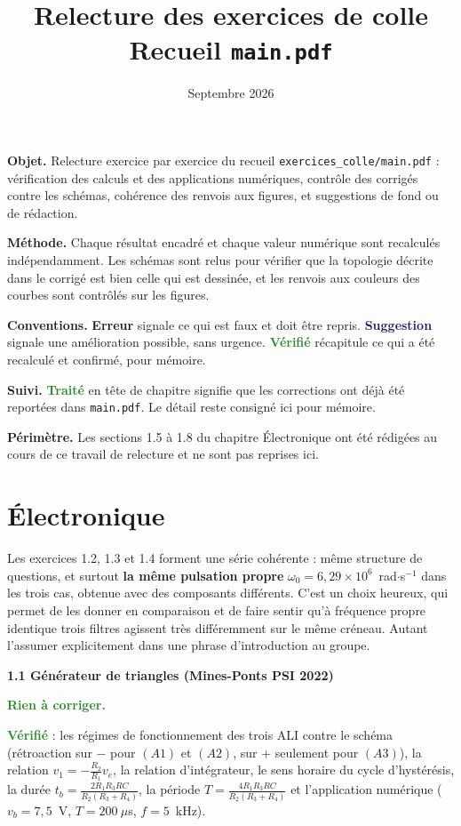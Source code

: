 \documentclass[a4paper,11pt]{article}
\title{\vspace{-1.5cm}Relecture des exercices de colle\\[0.3em]\large Recueil \texttt{main.pdf}}
\author{}
\date{Septembre 2026}
\newcommand{\exo}[1]{\vspace{0.7\baselineskip}\noindent\textbf{\large #1}\par\nopagebreak\vspace{0.2\baselineskip}}
\newcommand{\erreur}{\textcolor{BrickRed}{\textbf{Erreur}}}
\newcommand{\suggestion}{\textcolor{MidnightBlue}{\textbf{Suggestion}}}
\newcommand{\verifie}{\textcolor{ForestGreen}{\textbf{Vérifié}}}
\newcommand{\rien}{\textcolor{ForestGreen}{\textbf{Rien à corriger.}}}
\newcommand{\traite}{\textcolor{ForestGreen}{\textbf{Traité}}}
\begin{document}
\maketitle
\thispagestyle{fancy}

\noindent\textbf{Objet.} Relecture exercice par exercice du recueil \texttt{exercices\_colle/main.pdf} :
vérification des calculs et des applications numériques, contrôle des corrigés contre les schémas,
cohérence des renvois aux figures, et suggestions de fond ou de rédaction.

\medskip
\noindent\textbf{Méthode.} Chaque résultat encadré et chaque valeur numérique sont recalculés
indépendamment. Les schémas sont relus pour vérifier que la topologie décrite dans le corrigé est
bien celle qui est dessinée, et les renvois aux couleurs des courbes sont contrôlés sur les figures.

\medskip
\noindent\textbf{Conventions.} \erreur{} signale ce qui est faux et doit être repris.
\suggestion{} signale une amélioration possible, sans urgence. \verifie{} récapitule ce qui a été
recalculé et confirmé, pour mémoire.

\medskip
\noindent\textbf{Suivi.} \traite{} en tête de chapitre signifie que les corrections ont
déjà été reportées dans \texttt{main.pdf}. Le détail reste consigné ici pour mémoire.

\medskip
\noindent\textbf{Périmètre.} Les sections 1.5 à 1.8 du chapitre \'Electronique ont été rédigées au
cours de ce travail de relecture et ne sont pas reprises ici.

\section{\'Electronique}

Les exercices 1.2, 1.3 et 1.4 forment une série cohérente : même structure de questions, et surtout
\textbf{la même pulsation propre} $\omega_0 = 6{,}29\times10^{6}$~rad$\cdot$s$^{-1}$ dans les trois cas,
obtenue avec des composants différents. C'est un choix heureux, qui permet de les donner en
comparaison et de faire sentir qu'à fréquence propre identique trois filtres agissent très
différemment sur le même créneau. Autant l'assumer explicitement dans une phrase d'introduction au
groupe.

\exo{1.1 Générateur de triangles (Mines-Ponts PSI 2022)}

\rien{}

\verifie{} : les régimes de fonctionnement des trois ALI contre le schéma (rétroaction sur $-$ pour
$(A1)$ et $(A2)$, sur $+$ seulement pour $(A3)$), la relation $v_1=-\frac{R_2}{R_1}v_e$, la relation
d'intégrateur, le sens horaire du cycle d'hystérésis, la durée $t_b=\frac{2R_1R_3RC}{R_2(R_3+R_4)}$,
la période $T=\frac{4R_1R_3RC}{R_2(R_3+R_4)}$ et l'application numérique ($v_b=7{,}5$~V,
$T=200~\mu$s, $f=5$~kHz).
\end{document}

